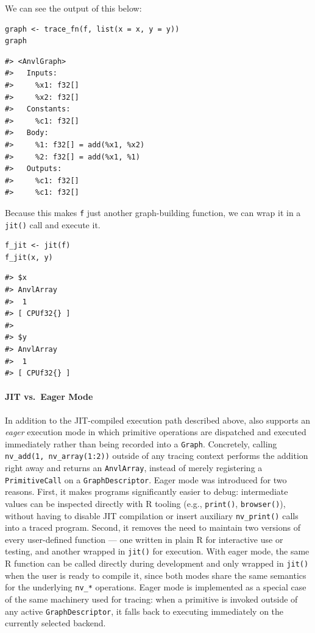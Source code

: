 We can see the output of this below:

\begin{verbatim}
graph <- trace_fn(f, list(x = x, y = y))
graph
\end{verbatim}

\begin{verbatim}
#> <AnvlGraph>
#>   Inputs:
#>     %x1: f32[]
#>     %x2: f32[]
#>   Constants:
#>     %c1: f32[]
#>   Body:
#>     %1: f32[] = add(%x1, %x2)
#>     %2: f32[] = add(%x1, %1)
#>   Outputs:
#>     %c1: f32[]
#>     %c1: f32[]
\end{verbatim}

Because this makes \texttt{f} just another graph-building function, we can wrap it in a \texttt{jit()} call and execute it.

\begin{verbatim}
f_jit <- jit(f)
f_jit(x, y)
\end{verbatim}

\begin{verbatim}
#> $x
#> AnvlArray
#>  1
#> [ CPUf32{} ] 
#> 
#> $y
#> AnvlArray
#>  1
#> [ CPUf32{} ]
\end{verbatim}

\paragraph{JIT vs.~Eager Mode}\label{jit-vs.-eager-mode}

In addition to the JIT-compiled execution path described above,  also supports an \emph{eager} execution mode in which primitive operations are dispatched and executed immediately rather than being recorded into a \texttt{Graph}.
Concretely, calling \texttt{nv\_add(1,\ nv\_array(1:2))} outside of any tracing context performs the addition right away and returns an \texttt{AnvlArray}, instead of merely registering a \texttt{PrimitiveCall} on a \texttt{GraphDescriptor}.
Eager mode was introduced for two reasons.
First, it makes programs significantly easier to debug: intermediate values can be inspected directly with R tooling (e.g., \texttt{print()}, \texttt{browser()}), without having to disable JIT compilation or insert auxiliary \texttt{nv\_print()} calls into a traced program.
Second, it removes the need to maintain two versions of every user-defined function --- one written in plain R for interactive use or testing, and another wrapped in \texttt{jit()} for execution.
With eager mode, the same R function can be called directly during development and only wrapped in \texttt{jit()} when the user is ready to compile it, since both modes share the same semantics for the underlying \texttt{nv\_*} operations.
Eager mode is implemented as a special case of the same machinery used for tracing: when a primitive is invoked outside of any active \texttt{GraphDescriptor}, it falls back to executing immediately on the currently selected backend.

